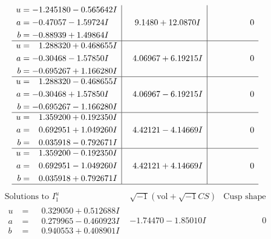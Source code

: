 \documentclass[1p]{elsarticle_modified}
\theoremstyle{definition}
\newcommand{\I}{\sqrt{-1}}
\begin{document}
$$\begin{array}{c|c|c}
\begin{aligned}
u &= -1.245180 - 0.565642 I \\
a &= -0.47057 - 1.59724 I \\
b &= -0.88939 + 1.49864 I\end{aligned}
 & \phantom{-}9.1480 + 12.0870 I & \phantom{-0.000000 } 0 \\ \hline\begin{aligned}
u &= \phantom{-}1.288320 + 0.468655 I \\
a &= -0.30468 - 1.57850 I \\
b &= -0.695267 + 1.166280 I\end{aligned}
 & \phantom{-}4.06967 + 6.19215 I & \phantom{-0.000000 } 0 \\ \hline\begin{aligned}
u &= \phantom{-}1.288320 - 0.468655 I \\
a &= -0.30468 + 1.57850 I \\
b &= -0.695267 - 1.166280 I\end{aligned}
 & \phantom{-}4.06967 - 6.19215 I & \phantom{-0.000000 } 0 \\ \hline\begin{aligned}
u &= \phantom{-}1.359200 + 0.192350 I \\
a &= \phantom{-}0.692951 + 1.049260 I \\
b &= \phantom{-}0.035918 - 0.792671 I\end{aligned}
 & \phantom{-}4.42121 - 4.14669 I & \phantom{-0.000000 } 0 \\ \hline\begin{aligned}
u &= \phantom{-}1.359200 - 0.192350 I \\
a &= \phantom{-}0.692951 - 1.049260 I \\
b &= \phantom{-}0.035918 + 0.792671 I\end{aligned}
 & \phantom{-}4.42121 + 4.14669 I & \phantom{-0.000000 } 0\\
 \hline 
 \end{array}$$\newpage$$\begin{array}{c|c|c}  
\text{Solutions to }I^u_{1}& \I (\text{vol} + \sqrt{-1}CS) & \text{Cusp shape}\\
 \hline 
\begin{aligned}
u &= \phantom{-}0.329050 + 0.512688 I \\
a &= \phantom{-}0.279965 - 0.460923 I \\
b &= \phantom{-}0.940553 + 0.408901 I\end{aligned}
 & -1.74470 - 1.85010 I & \phantom{-0.000000 } 0 \\ \hline\begin{aligned}

\end{aligned}
\end{array}$$
\end{document}
